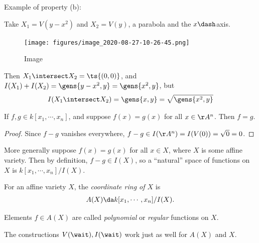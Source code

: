 \begin{example}

Example of property (b):

Take \(X_1 = V(y-x^2)\) and \(X_2 = V(y)\), a parabola and the
\(x\dash\)axis.

\begin{figure}
\centering
\texttt{[image: figures/image\_2020-08-27-10-26-45.png]}
\caption{Image}
\end{figure}

Then \(X_1 \intersect X_2 = \ts{(0, 0)}\), and
\(I(X_1) + I(X_2) = \gens{y-x^2, y} = \gens{x^2, y}\), but
\begin{align*}
I(X_1 \intersect X_2) = \gens{x, y} = \sqrt{\gens{x^2, y}}
\end{align*}

\end{example}

\begin{proposition}[?]

If \(f, g\in k[x_1, \cdots, x_n]\), and suppose \(f(x) = g(x)\) for all
\(x\in \AA^n\). Then \(f = g\).

\end{proposition}

\begin{proof}

Since \(f-g\) vanishes everywhere,
\(f-g \in I(\AA^n) = I(V(0)) = \sqrt{0} = 0\).

\end{proof}

More generally suppose \(f(x) = g(x)\) for all \(x\in X\), where \(X\)
is some affine variety. Then by definition, \(f-g \in I(X)\), so a
``natural'' space of functions on \(X\) is \(k[x_1,\cdots, x_n]/I(X)\).

\begin{definition}

For an affine variety \(X\), the \emph{coordinate ring of \(X\)} is
\begin{align*}  
A(X) \da k[x_1, \cdots, x_n]/ I(X)
.\end{align*}

Elements \(f\in A(X)\) are called \emph{polynomial} or \emph{regular}
functions on \(X\).

\end{definition}

\begin{observation}

The constructions \(V(\wait), I(\wait)\) work just as well for \(A(X)\)
and \(X\).

\end{observation}

